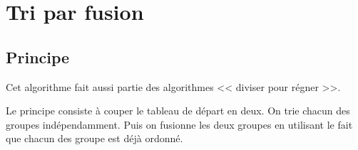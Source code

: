 %
%
\section{Tri par fusion}

\subsection{Principe}


Cet algorithme fait aussi partie des algorithmes << diviser pour régner >>.

Le principe consiste à couper le tableau de départ en deux. On trie chacun des groupes indépendamment. Puis on fusionne les deux groupes en utilisant le fait que chacun des groupe est déjà ordonné.

